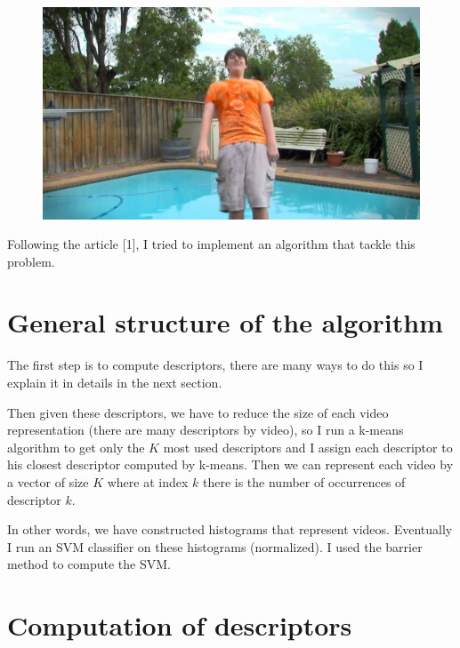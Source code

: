 \documentclass[10pt,a4paper]{report}
\begin{document}
\begin{figure}[h]
\begin{minipage}[b]{0.30\linewidth}
		\end{minipage}
		\hspace{5pt}
		\begin{minipage}[b]{0.30\linewidth}
			\includegraphics[width=1.0\textwidth]{im50.jpeg}
		\end{minipage}
		\label{fig:f}
	\end{figure}
	
	Following the article [1], I tried to implement an algorithm that tackle this problem.
	
	\section*{General structure of the algorithm}
	
		The first step is to compute descriptors, there are many ways to do this so I explain it in details in the next section.
		
		Then given these descriptors, we have to reduce the size of each video representation (there are many descriptors by video), so I run a k-means algorithm to get only the $K$ most used descriptors and I assign each descriptor to his closest descriptor computed by k-means. Then we can represent each video by a vector of size $K$ where at index $k$ there is the number of occurrences of descriptor $k$.
		
		In other words, we have constructed histograms that represent videos. Eventually I run an SVM classifier on these histograms (normalized). I used the barrier method to compute the SVM.
	
		\section*{Computation of descriptors}
		
\end{document}
